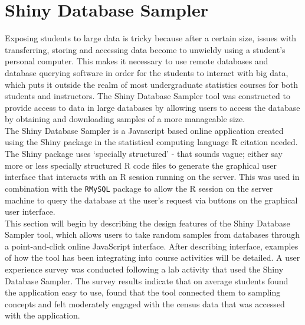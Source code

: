 \documentclass{article}\usepackage[]{graphicx}\usepackage[]{color}
\newcommand{\hh}[1]{{\color{ForestGreen} #1}}
\newcommand{\km}[1]{{\color{Orange} #1}}
\begin{document}
\section{Shiny Database Sampler}

Exposing students to large data is tricky because after a certain size, issues with transferring, storing and accessing data become to unwieldy using a student's personal computer.  This makes it necessary to use  remote databases and database querying software in order for the students to interact with big data, which puts it outside the realm of most undergraduate statistics courses for both students and instructors.  
The Shiny Database Sampler tool was constructed to provide access to data in large databases 
by allowing users to access the database by obtaining and downloading samples of a more manageable size.\\

The Shiny Database Sampler is a Javascript based online application created using the Shiny package \citep{shiny} in the statistical computing language R \hh{citation needed}. The Shiny package uses \hh{`specially structured' - that sounds  vague; either say more or less} specially structured R code files to generate the graphical user interface that interacts with an R session running on the server.  This was used in combination with the \texttt{RMySQL} package \citep{RMySQL} to allow the R session on the server machine to query the database at the user's request via buttons on the graphical user interface.  \\  

\km{  This section will begin by describing the design features of the Shiny Database Sampler tool, which allows users to take random samples from databases through a point-and-click online JavaScript interface.  After describing interface, examples of how the tool has been integrating into course activities will be detailed. A user experience survey was conducted following a lab activity that used the Shiny Database Sampler.  The survey results indicate that on average students found the application easy to use, found that the tool connected them to sampling concepts and felt moderately engaged with the census data that was accessed with the application. \\  }
\end{document}
